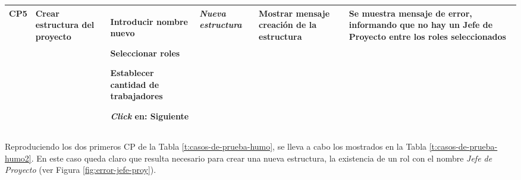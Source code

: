\begin{table}[H]
{\begin{tabular}{c p{2.3cm} e{4.7cm} p{2cm} p{3cm} p{3cm}}
			CP5 & Crear estructura del proyecto & 
			\item Introducir nombre nuevo
			\item Seleccionar roles
			\item Establecer cantidad de trabajadores
			\item \textit{Click} en: Siguiente
			& \textit{Nueva estructura} & Mostrar mensaje creación de la estructura
			 & Se muestra mensaje de error, informando que no hay un \textbf{Jefe de Proyecto} entre los roles seleccionados\\ \bottomrule
		\end{tabular}
	}
\end{table}

Reproduciendo los dos primeros CP de la Tabla \ref{t:casos-de-prueba-humo}, se lleva a cabo los mostrados en la Tabla \ref{t:casos-de-prueba-humo2}. En este caso queda claro que resulta necesario para crear una nueva estructura, la existencia de un rol con el nombre \textit{Jefe de Proyecto} (ver Figura \ref{fig:error-jefe-proy}).

